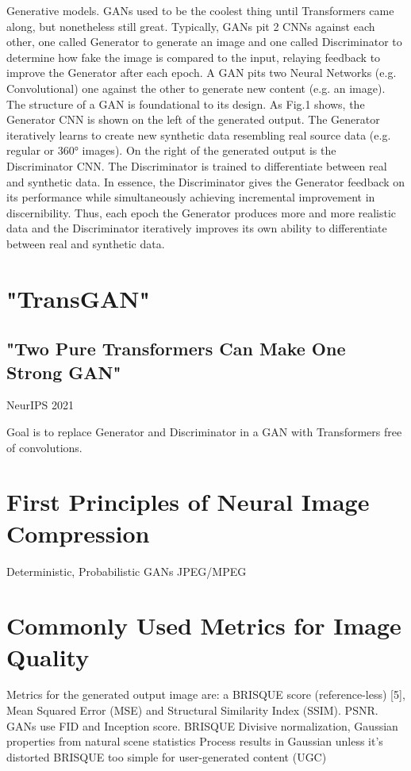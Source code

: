 Generative models.
GANs used to be the coolest thing until Transformers came along, but nonetheless 
still great. Typically, GANs pit 2 CNNs against each other, one called Generator to 
generate an image and one called Discriminator to determine how fake the image is 
compared to the input, relaying feedback to improve the Generator after each epoch. 
A GAN pits two Neural Networks (e.g. Convolutional) one against the other to generate 
new content (e.g. an image). The structure of a GAN is foundational to its design. 
As Fig.1 shows, the Generator CNN is shown on the left of the generated output. 
The Generator iteratively learns to create new synthetic data resembling real source data 
(e.g. regular or 360° images).  On the right of the generated output is the Discriminator CNN.
The Discriminator is trained to differentiate between real and synthetic data. 
In essence, the Discriminator gives the Generator feedback on its performance while 
simultaneously achieving incremental improvement in discernibility. 
Thus, each epoch the Generator produces more and more realistic data and the Discriminator iteratively improves its own ability to differentiate between real and synthetic data.


\section{"TransGAN"}
\subsection{"Two Pure Transformers Can Make One Strong GAN"}
NeurIPS 2021

Goal is to replace Generator and Discriminator in a GAN with Transformers free of 
convolutions. 

\section{First Principles of Neural Image Compression}

Deterministic, Probabilistic
GANs
JPEG/MPEG

\section{Commonly Used Metrics for Image Quality}
Metrics for the generated output image are: a BRISQUE score (reference-less) [5], 
Mean Squared Error (MSE) and Structural Similarity Index (SSIM). PSNR.
GANs use FID and Inception score. 
BRISQUE
Divisive normalization, Gaussian properties from natural scene statistics
Process results in Gaussian unless it's distorted
BRISQUE too simple for user-generated content (UGC)